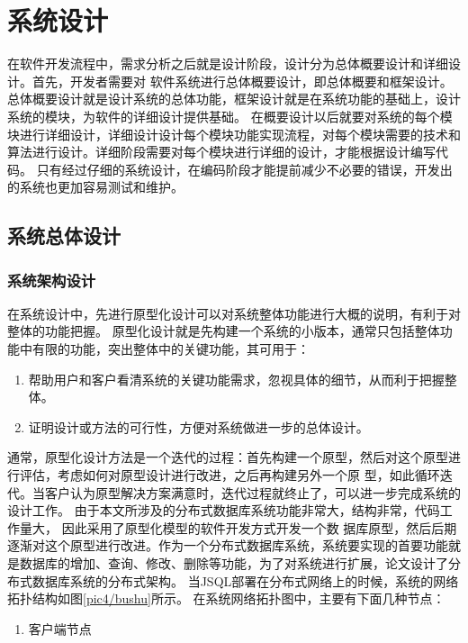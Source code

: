 
\chapter{系统设计}
在软件开发流程中，需求分析之后就是设计阶段，设计分为总体概要设计和详细设计。首先，开发者需要对
软件系统进行总体概要设计，即总体概要和框架设计。总体概要设计就是设计系统的总体功能，框架设计就是在系统功能的基础上，设计系统的模块，为软件的详细设计提供基础。
在概要设计以后就要对系统的每个模块进行详细设计，详细设计设计每个模块功能实现流程，对每个模块需要的技术和算法进行设计。详细阶段需要对每个模块进行详细的设计，才能根据设计编写代码。
只有经过仔细的系统设计，在编码阶段才能提前减少不必要的错误，开发出的系统也更加容易测试和维护。
\section{系统总体设计}
\subsection{系统架构设计}
在系统设计中，先进行原型化设计可以对系统整体功能进行大概的说明，有利于对整体的功能把握。
原型化设计就是先构建一个系统的小版本，通常只包括整体功能中有限的功能，突出整体中的关键功能，其可用于：
\begin{enumerate}
	\item 帮助用户和客户看清系统的关键功能需求，忽视具体的细节，从而利于把握整体。
	\item 证明设计或方法的可行性，方便对系统做进一步的总体设计。
\end{enumerate}
通常，原型化设计方法是一个迭代的过程：首先构建一个原型，然后对这个原型进行评估，考虑如何对原型设计进行改进，之后再构建另外一个原
型，如此循环迭代。当客户认为原型解决方案满意时，迭代过程就终止了，可以进一步完成系统的设计工作。
由于本文所涉及的分布式数据库系统功能非常大，结构非常，代码工作量大，
因此采用了原型化模型的软件开发方式开发一个数
据库原型，然后后期逐渐对这个原型进行改进。作为一个分布式数据库系统，系统要实现的首要功能就是数据库的增加、查询、修改、删除等功能，为了对系统进行扩展，论文设计了分布式数据库系统的分布式架构。
当JSQL部署在分布式网络上的时候，系统的网络拓扑结构如图\ref{pic4/bushu}所示。
在系统网络拓扑图中，主要有下面几种节点：


	\begin{enumerate}
		\item 客户端节点
	\end{enumerate}

